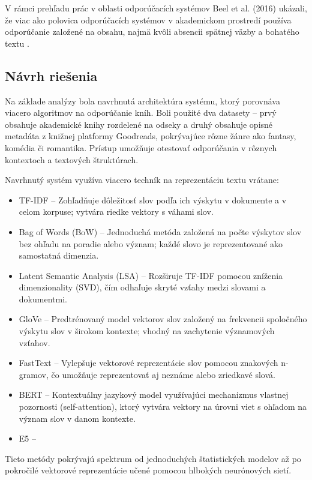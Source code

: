 \documentclass[\myFontSize,a4paper,oneside,hidelinks]{article}
\begin{document}
V rámci prehľadu prác v oblasti odporúčacích systémov Beel et al. (2016) ukázali, že viac ako polovica odporúčacích systémov v akademickom prostredí používa odporúčanie založené na obsahu, najmä kvôli absencii spätnej väzby a bohatého textu \cite{Beel2016305}. 



\subsection*{Návrh riešenia}

Na základe analýzy bola navrhnutá architektúra systému, ktorý porovnáva viacero algoritmov na odporúčanie kníh. Boli použité dva datasety – prvý obsahuje akademické knihy rozdelené na odseky a druhý obsahuje opisné metadáta z knižnej platformy Goodreads, pokrývajúce rôzne žánre ako fantasy, komédia či romantika. Prístup umožňuje otestovať odporúčania v rôznych kontextoch a textových štruktúrach.

Navrhnutý systém využíva viacero techník na reprezentáciu textu vrátane:
\begin{itemize}
\item TF-IDF – Zohľadňuje dôležitosť slov podľa ich výskytu v dokumente a v celom korpuse; vytvára riedke vektory s váhami slov.
\item Bag of Words (BoW) – Jednoduchá metóda založená na počte výskytov slov bez ohľadu na poradie alebo význam; každé slovo je reprezentované ako samostatná dimenzia.
\item Latent Semantic Analysis (LSA) – Rozširuje TF-IDF pomocou zníženia dimenzionality (SVD), čím odhaľuje skryté vzťahy medzi slovami a dokumentmi.
\item GloVe – Predtrénovaný model vektorov slov založený na frekvencii spoločného výskytu slov v širokom kontexte; vhodný na zachytenie významových vzťahov.
\item FastText – Vylepšuje vektorové reprezentácie slov pomocou znakových n-gramov, čo umožňuje reprezentovať aj neznáme alebo zriedkavé slová.
\item BERT  – Kontextuálny jazykový model využívajúci mechanizmus vlastnej pozornosti (self-attention), ktorý vytvára vektory na úrovni viet s ohľadom na význam slov v danom kontexte.
\item E5 –
\end{itemize}
Tieto metódy pokrývajú spektrum od jednoduchých štatistických modelov až po pokročilé vektorové reprezentácie učené pomocou hlbokých neurónových sietí.
\end{document}
